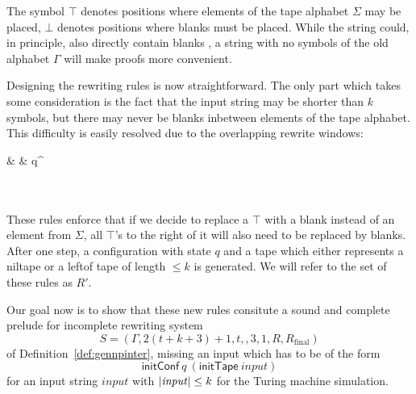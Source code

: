 \documentclass[a4paper,UKenglish,cleveref, autoref]{lipics-v2019}
\newcommand{\Rfinal}{R_{\text{final}}}
\begin{document}
The symbol $\top$ denotes positions where elements of the tape alphabet $\Sigma$ may be placed, $\bot$ denotes positions where blanks must be placed. While the string could, in principle, also directly contain blanks \blank{}, a string with no symbols of the old alphabet $\Gamma$ will make proofs more convenient. 

Designing the rewriting rules is now straightforward. The only part which takes some consideration is the fact that the input string may be shorter than $k$ symbols, but there may never be blanks inbetween elements of the tape alphabet. This difficulty is easily resolved due to the overlapping rewrite windows:
\begin{center}
  \rewwin{\bot & \bot & \bot}{\blank & \blank & \blank}
   {\blank & \blank & q^\blank}
   \\[3ex]
   \\[3ex]
  \rewwin{\top & \top & \top}{\blank & \blank & \blank} \\[3ex]
  \rewwin{\top & \top & \bot}{\blank & \blank & \blank} 
  \rewwin{\top & \bot & \bot}{\blank & \blank & \blank}
\end{center}

These rules enforce that if we decide to replace a $\top$ with a blank instead of an element from $\Sigma$, all $\top$'s to the right of it will also need to be replaced by blanks. After one step, a configuration with state $q$ and a tape which either represents a \textsf{niltape} or a \textsf{leftof} tape of length $\le k$ is generated. 
We will refer to the set of these rules as $R'$.

Our goal now is to show that these new rules consitute a sound and complete prelude for incomplete rewriting system 
\[S = (\Gamma, 2(t + k + 3) + 1, t, , 3, 1, R, \Rfinal)\]
of Definition~\ref{def:gennpinter}, missing an input which has to be of the form 
\[ \textsf{initConf}~q~(\textsf{initTape}~\mathit{input}) \]
for an input string $\mathit{input}$ with $|\mathit{input}| \le k$ for the Turing machine simulation.
\end{document}
